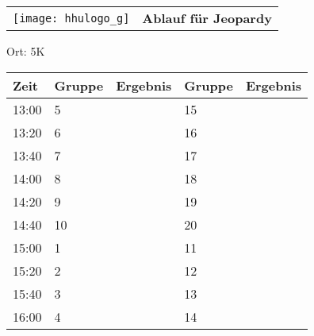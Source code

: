 \documentclass[a4paper,10pt]{article}
\def\spiele{Jeopardy}
\def\raume{5K}
\begin{document}
   \newpage
  \begin{tabularx}{\textwidth}{lc}
    \texttt{[image: hhulogo\_g]}
  & {\Huge \textbf{Ablauf für \spiele}}
  \end{tabularx}
  \LARGE
  \begin{center}
    \vspace{1cm} 
    Ort: \raume
  \end{center}
    \vspace{2cm} 
    \begin{tabularx}{\textwidth}{X||X|X||X|X}
	\textbf{Zeit} &\textbf{Gruppe} & \textbf{Ergebnis} &\textbf{Gruppe} & \textbf{Ergebnis}  	\\ \hline \hline
	13:00 &	5	&	&15	&	\\ \hline
	13:20 &	6	&	&16	&	\\ \hline
	13:40 &	7	&	&17	&	\\ \hline

	14:00 &	8	&	&18	&	\\ \hline
	14:20 &	9	&	&19	&	\\ \hline
	14:40 &	10	&	&20	&	\\ \hline

	15:00 &	1	&	&11	&	\\ \hline
	15:20 &	2	&	&12	&	\\ \hline
	15:40 &	3	&	&13	&	\\ \hline

	16:00 &	4	&	&14	&	\\ \hline
      
    \end{tabularx}
   
\end{document}
